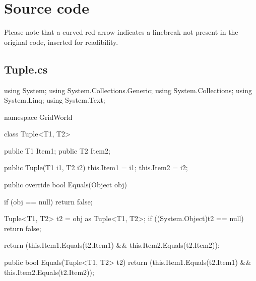 \documentclass[11pt]{article}
\begin{document}
\section{Source code}
Please note that a curved red arrow indicates a linebreak not present in the original code, inserted for readibility.

\subsection*{Tuple.cs}
\begin{code}
using System;
using System.Collections.Generic;
using System.Collections;
using System.Linq;
using System.Text;

namespace GridWorld
{
    class Tuple<T1, T2> 
    {
        public T1 Item1;
        public T2 Item2;

        public Tuple(T1 i1, T2 i2) {
            this.Item1 = i1;
            this.Item2 = i2;
        }
   
        public override bool Equals(Object obj) {
            if (obj == null)
            {
                return false;
            }

            Tuple<T1, T2> t2 = obj as Tuple<T1, T2>;
            if ((System.Object)t2 == null)
            {
                return false;
            }
            
            return (this.Item1.Equals(t2.Item1) && this.Item2.Equals(t2.Item2));
        }

        public bool Equals(Tuple<T1, T2> t2)
        {
            return (this.Item1.Equals(t2.Item1) && this.Item2.Equals(t2.Item2));
        }
    }
}
\end{code}
\end{document}
